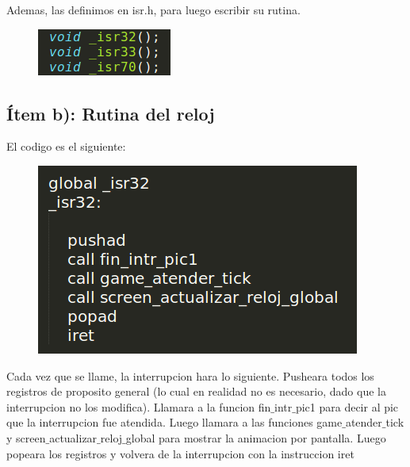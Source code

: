Ademas, las definimos en isr.h, para luego escribir su rutina.

\begin{figure}[H]
\begin{center}
  \includegraphics[width=\linewidth]{ejercicio5/isr.png}
\endminipage
\end{center}
\end{figure}

\subsection{Ítem b): Rutina del reloj}

El codigo es el siguiente:
\begin{figure}[H]
\begin{center}
  \includegraphics[width=\linewidth]{ejercicio5/rutinaReloj.png}
\endminipage
\end{center}
\end{figure}

Cada vez que se llame, la interrupcion hara lo siguiente. Pusheara todos los registros de proposito general (lo cual en realidad no es necesario, dado que la interrupcion no los modifica). Llamara a la funcion fin$\_$intr$\_$pic1 para decir al pic que la interrupcion fue atendida. Luego llamara a las funciones game$\_$atender$\_$tick y screen$\_$actualizar$\_$reloj$\_$global para mostrar la animacion por pantalla. Luego popeara los registros y volvera de la interrupcion con la instruccion iret


